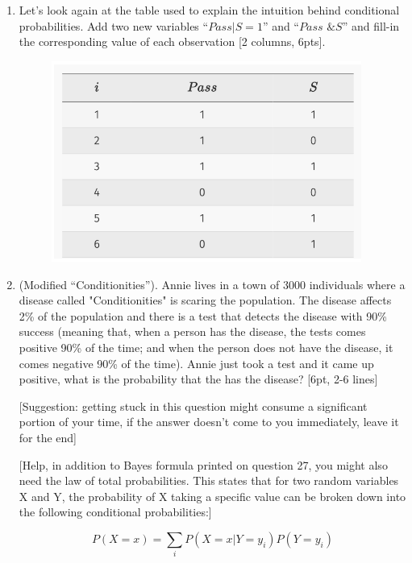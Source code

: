 \documentclass[12pt,notitlepage]{article}
\begin{document}
\begin{enumerate}
\item Let’s look again at the table used to explain the intuition behind conditional probabilities. Add two new variables “$Pass|S=1$” and “$Pass \text{ \& } S$” and fill-in the corresponding value of each observation [2 columns, 6pts]. 
\begin{figure}[H]
    \centering
    \includegraphics[width=4in]{Figures/midterm_pass.png}
    \caption{}
    \label{}
\end{figure}
\vspace{5cm}


\item (Modified ``Conditionities''). Annie lives in a town of 3000 individuals where a disease called "Conditionities" is scaring the population. The disease affects 2\% of the population and there is a test that detects the disease with 90\% success (meaning that, when a person has the disease, the tests comes positive 90\% of the time; and when the person does not have the disease, it comes negative 90\% of the time). Annie just took a test and it came up positive, what is the probability that the has the disease? [6pt, 2-6 lines] 

[Suggestion: getting stuck in this question might consume a significant portion of your time, if the answer doesn't come to you immediately, leave it for the end]

[Help, in addition to Bayes formula printed on question 27, you might also need the law of total probabilities. This states that for two random variables X and Y, the probability of X taking a specific value can be broken down into the following conditional probabilities:]

\begin{equation}
    P(X=x) = \sum_{i}P(X=x|Y=y_i)P(Y=y_i)
\end{equation}


\vspace{3cm}


\end{enumerate}
\end{document}
